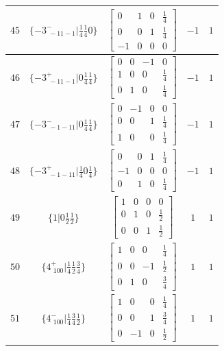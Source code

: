 \documentclass[fleqn,8pt]{jsarticle}
\begin{document}
\begin{longtable}{ccccc}
$ 45 $ & $ \{-3^{-}_{\,\,-11-1}|\frac{1}{4} \frac{1}{4} 0\} $ & $ \begin{bmatrix} 0 & 1 & 0 & \frac{1}{4} \\ 0 & 0 & 1 & \frac{1}{4} \\ -1 & 0 & 0 & 0 \end{bmatrix} $ & $ -1 $ & $ 1 $ \\ \hline
$ 46 $ & $ \{-3^{+}_{\,\,-11-1}|0 \frac{1}{4} \frac{1}{4}\} $ & $ \begin{bmatrix} 0 & 0 & -1 & 0 \\ 1 & 0 & 0 & \frac{1}{4} \\ 0 & 1 & 0 & \frac{1}{4} \end{bmatrix} $ & $ -1 $ & $ 1 $ \\ \hline
$ 47 $ & $ \{-3^{-}_{\,\,-1-11}|0 \frac{1}{4} \frac{1}{4}\} $ & $ \begin{bmatrix} 0 & -1 & 0 & 0 \\ 0 & 0 & 1 & \frac{1}{4} \\ 1 & 0 & 0 & \frac{1}{4} \end{bmatrix} $ & $ -1 $ & $ 1 $ \\ \hline
$ 48 $ & $ \{-3^{+}_{\,\,-1-11}|\frac{1}{4} 0 \frac{1}{4}\} $ & $ \begin{bmatrix} 0 & 0 & 1 & \frac{1}{4} \\ -1 & 0 & 0 & 0 \\ 0 & 1 & 0 & \frac{1}{4} \end{bmatrix} $ & $ -1 $ & $ 1 $ \\ \hline
$ 49 $ & $ \{1|0 \frac{1}{2} \frac{1}{2}\} $ & $ \begin{bmatrix} 1 & 0 & 0 & 0 \\ 0 & 1 & 0 & \frac{1}{2} \\ 0 & 0 & 1 & \frac{1}{2} \end{bmatrix} $ & $ 1 $ & $ 1 $ \\ \hline
$ 50 $ & $ \{4^{+}_{\,\,100}|\frac{1}{4} \frac{1}{2} \frac{3}{4}\} $ & $ \begin{bmatrix} 1 & 0 & 0 & \frac{1}{4} \\ 0 & 0 & -1 & \frac{1}{2} \\ 0 & 1 & 0 & \frac{3}{4} \end{bmatrix} $ & $ 1 $ & $ 1 $ \\ \hline
$ 51 $ & $ \{4^{-}_{\,\,100}|\frac{1}{4} \frac{3}{4} \frac{1}{2}\} $ & $ \begin{bmatrix} 1 & 0 & 0 & \frac{1}{4} \\ 0 & 0 & 1 & \frac{3}{4} \\ 0 & -1 & 0 & \frac{1}{2} \end{bmatrix} $ & $ 1 $ & $ 1 $ \\ \hline

\end{longtable}
\end{document}

